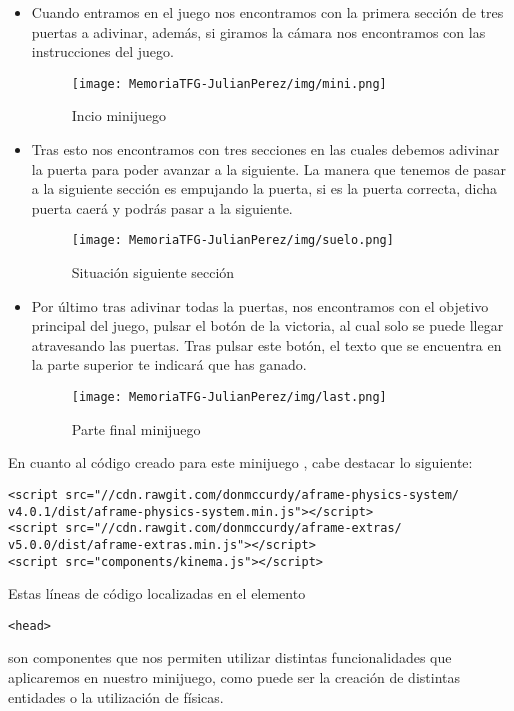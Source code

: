 \documentclass[a4paper, 12pt]{book}
\begin{document}
\begin{itemize}
    \item Cuando entramos en el juego nos encontramos con la primera sección de tres puertas a adivinar, además, si giramos la cámara nos encontramos con las instrucciones del juego.
    \begin{figure}[H]
  \centering
  \texttt{[image: MemoriaTFG-JulianPerez/img/mini.png]}
  \caption{Incio minijuego}\label{scrum}
\end{figure}
    \item Tras esto nos encontramos con tres secciones en las cuales debemos adivinar la puerta para poder avanzar a la siguiente. La manera que tenemos de pasar a la siguiente sección es empujando la puerta, si es la puerta correcta, dicha puerta caerá y podrás pasar a la siguiente.
     \begin{figure}[H]
  \centering
  \texttt{[image: MemoriaTFG-JulianPerez/img/suelo.png]}
  \caption{Situación siguiente sección}\label{scrum}
\end{figure}
    \item Por último tras adivinar todas la puertas, nos encontramos con el objetivo principal del juego, pulsar el botón de la victoria, al cual solo se puede llegar atravesando las puertas. Tras pulsar este botón, el texto que se encuentra en la parte superior te indicará que has ganado.
         \begin{figure}[H]
  \centering
  \texttt{[image: MemoriaTFG-JulianPerez/img/last.png]}
  \caption{Parte final minijuego}\label{scrum}
\end{figure}

\end{itemize}

En cuanto al código creado para este minijuego , cabe destacar lo siguiente:
{\scriptsize
\begin{verbatim}
<script src="//cdn.rawgit.com/donmccurdy/aframe-physics-system/
v4.0.1/dist/aframe-physics-system.min.js"></script>
<script src="//cdn.rawgit.com/donmccurdy/aframe-extras/
v5.0.0/dist/aframe-extras.min.js"></script>
<script src="components/kinema.js"></script>
\end{verbatim}  
}
Estas líneas de código localizadas en el elemento \begin{verbatim}
<head>
\end{verbatim} son componentes que nos permiten utilizar distintas funcionalidades que aplicaremos en nuestro minijuego, como puede ser la creación de distintas entidades o la utilización de físicas.
\end{document}
